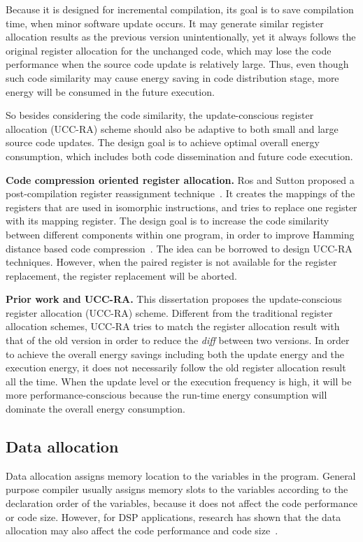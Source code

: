 Because it is designed for incremental compilation, its goal is to save compilation time, when minor software update 
occurs. It may generate similar register allocation results as the previous version unintentionally, yet it always 
follows the original register allocation for the unchanged code, which may lose the code performance when the source 
code update is relatively large. Thus, even though such code similarity may cause energy saving in code distribution 
stage, more energy will be consumed in the future execution.

So besides considering the code similarity, the update-conscious register allocation (UCC-RA) scheme should also be 
adaptive to both small and large source code updates. The design goal is to achieve optimal overall energy consumption, 
which includes both code dissemination and future code execution. 	

\textbf{Code compression oriented register allocation.}
Ros and Sutton proposed a post-compilation register reassignment technique~\cite{related:register-reassignment}. It 
creates the mappings of the registers that are used in isomorphic instructions, and tries to replace one register with 
its mapping register. The design goal is to increase the code similarity between different components within one 
program, in order to improve Hamming distance based code compression~\cite{hamming-compress}. 
The idea can be borrowed to design UCC-RA techniques. However, when the paired register is not available for the 
register replacement, the register replacement will be aborted. 

\textbf{Prior work and UCC-RA.}
This dissertation proposes the update-conscious register allocation (UCC-RA) scheme.
Different from the traditional register allocation schemes, UCC-RA tries to match the register allocation result with 
that of the old version in order to reduce the {\it diff} between two versions.
In order to achieve the overall energy savings including both the update energy and the execution energy, it does not 
necessarily follow the old register allocation result all the time. When the update level or the execution frequency is 
high, it will be more performance-conscious because the run-time energy consumption will dominate the overall energy 
consumption.


\subsection{Data allocation}
Data allocation assigns memory location to the variables in the program. General purpose compiler usually assigns 
memory slots to the variables according to the declaration order of the variables, because it does not affect the code 
performance or code size. However, for DSP applications, research has shown that the data allocation may also affect 
the code performance and code size~\cite{related:liao, related:bartley}.

